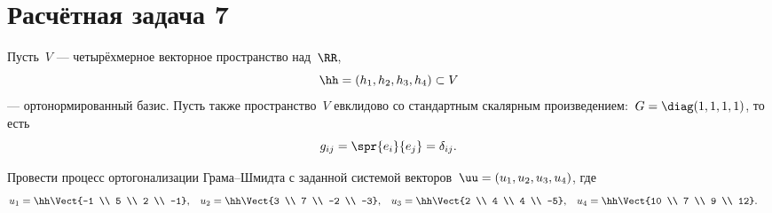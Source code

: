 \section{Расчётная задача 7}

Пусть~$V$ --- четырёхмерное векторное пространство над~$\RR$, 
\[
	\hh = (h_1, h_2, h_3, h_4) \subset V
\]
--- ортонормированный базис. Пусть также пространство~$V$ евклидово со стандартным скалярным произведением:~$G = \diag(1, 1, 1, 1)$, то есть
\[
	g_{ij} = \spr{e_i}{e_j} = \delta_{ij}
	.
\]

Провести процесс ортогонализации Грама--Шмидта с заданной системой векторов~$\uu = (u_1, u_2, u_3, u_4)$, где
\begin{align*}
	u_1 &=
	\hh
	\Vect{-1 \\ 5 \\ 2 \\ -1}
	,
	&
	u_2 &=
	\hh
	\Vect{3 \\ 7 \\ -2 \\ -3}
	,
	&
	u_3 &=
	\hh
	\Vect{2 \\ 4 \\ 4 \\ -5}
	,
	&
	u_4 &=
	\hh
	\Vect{10 \\ 7 \\ 9 \\ 12}
	.
\end{align*}

